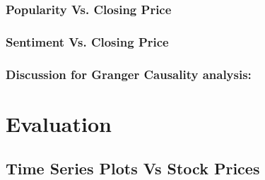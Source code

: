 \documentclass[sigconf, nonacm]{acmart}
\begin{document}
\subsubsection{Popularity Vs. Closing Price}
\subsubsection{Sentiment Vs. Closing Price}
\subsubsection{Discussion for Granger Causality analysis:}




\section{Evaluation}
\subsection{Time Series Plots Vs Stock Prices} 

\end{document}
